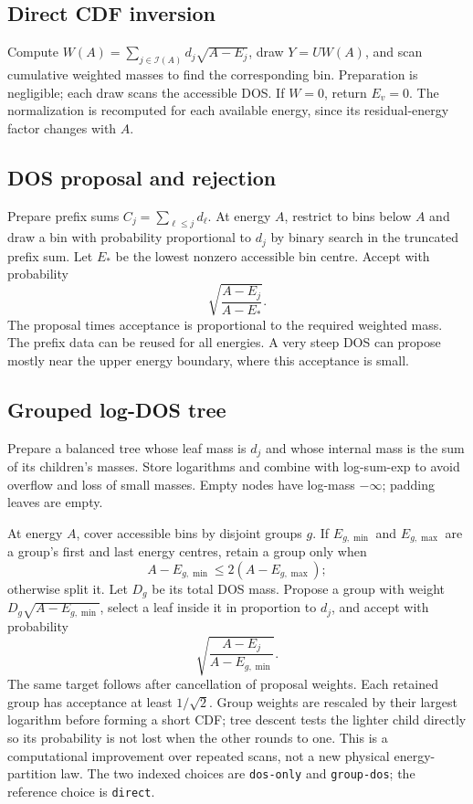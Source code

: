 \documentclass[10pt,a4paper]{article}
\begin{document}
\subsection{Direct CDF inversion}
Compute $W(A)=\sum_{j\in\mathcal I(A)}d_j\sqrt{A-E_j}$, draw
$Y=UW(A)$, and scan cumulative weighted masses to find the corresponding bin.
Preparation is negligible; each draw scans the accessible DOS. If $W=0$,
return $E_v=0$. The normalization is recomputed for each available energy,
since its residual-energy factor changes with $A$.

\subsection{DOS proposal and rejection}
Prepare prefix sums $C_j=\sum_{\ell\leq j}d_\ell$. At energy $A$, restrict to
bins below $A$ and draw a bin with probability proportional to $d_j$ by binary
search in the truncated prefix sum. Let $E_*$ be the lowest nonzero accessible
bin centre. Accept with probability
\[
 \sqrt{\frac{A-E_j}{A-E_*}}.
\]
The proposal times acceptance is proportional to the required weighted mass.
The prefix data can be reused for all energies. A very steep DOS can propose
mostly near the upper energy boundary, where this acceptance is small.

\subsection{Grouped log-DOS tree}
Prepare a balanced tree whose leaf mass is $d_j$ and whose internal mass is
the sum of its children's masses. Store logarithms and combine with
log-sum-exp to avoid overflow and loss of small masses. Empty nodes have
log-mass $-\infty$; padding leaves are empty.

At energy $A$, cover accessible bins by disjoint groups $g$. If $E_{g,\min}$
and $E_{g,\max}$ are a group's first and last energy centres, retain a group
only when
\[
 A-E_{g,\min}\leq2(A-E_{g,\max});
\]
otherwise split it. Let $D_g$ be its total DOS mass. Propose a group with
weight $D_g\sqrt{A-E_{g,\min}}$, select a leaf inside it in proportion to
$d_j$, and accept with probability
\[
 \sqrt{\frac{A-E_j}{A-E_{g,\min}}}.
\]
The same target follows after cancellation of proposal weights. Each retained
group has acceptance at least $1/\sqrt2$. Group weights are rescaled by their
largest logarithm before forming a short CDF; tree descent tests the lighter
child directly so its probability is not lost when the other rounds to one.
This is a computational improvement over repeated scans, not a new physical
energy-partition law. The two indexed choices are \texttt{dos-only} and
\texttt{group-dos}; the reference choice is \texttt{direct}.
\end{document}
